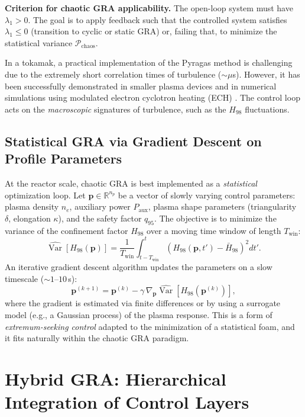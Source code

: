 \documentclass[12pt,a4paper]{article}
\begin{document}
\textbf{Criterion for chaotic GRA applicability.} The open-loop system must have $\lambda_1 > 0$. The goal is to apply feedback such that the controlled system satisfies $\lambda_1 \le 0$ (transition to cyclic or static GRA) or, failing that, to minimize the statistical variance $\mathcal{P}_{\text{chaos}}$.

In a tokamak, a practical implementation of the Pyragas method is challenging due to the extremely short correlation times of turbulence ($\sim\mu$s). However, it has been successfully demonstrated in smaller plasma devices and in numerical simulations using modulated electron cyclotron heating (ECH) \cite{Lazzaro2005}. The control loop acts on the \textit{macroscopic} signatures of turbulence, such as the $H_{98}$ fluctuations.

\subsection{Statistical GRA via Gradient Descent on Profile Parameters}

At the reactor scale, chaotic GRA is best implemented as a \textit{statistical} optimization loop. Let $\mathbf{p} \in \mathbb{R}^{n_p}$ be a vector of slowly varying control parameters: plasma density $n_e$, auxiliary power $P_{\text{aux}}$, plasma shape parameters (triangularity $\delta$, elongation $\kappa$), and the safety factor $q_{95}$. The objective is to minimize the variance of the confinement factor $H_{98}$ over a moving time window of length $T_{\text{win}}$:
\begin{equation}
\widehat{\operatorname{Var}}[H_{98}(\mathbf{p})] = \frac{1}{T_{\text{win}}} \int_{t-T_{\text{win}}}^{t} \left( H_{98}(\mathbf{p}, t') - \bar{H}_{98} \right)^2 dt'.
\end{equation}
An iterative gradient descent algorithm updates the parameters on a slow timescale ($\sim1$--$10$\,s):
\begin{equation}
\mathbf{p}^{(k+1)} = \mathbf{p}^{(k)} - \gamma \, \nabla_{\mathbf{p}} \widehat{\operatorname{Var}}[H_{98}(\mathbf{p}^{(k)})],
\label{eq:stat_grad}
\end{equation}
where the gradient is estimated via finite differences or by using a surrogate model (e.g., a Gaussian process) of the plasma response. This is a form of \textit{extremum-seeking control} adapted to the minimization of a statistical foam, and it fits naturally within the chaotic GRA paradigm.

\section{Hybrid GRA: Hierarchical Integration of Control Layers}
\label{sec:hybrid}
\end{document}
